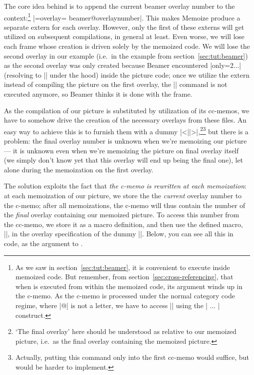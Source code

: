 \documentclass[a4paper,11pt]{article}
\begin{document}
The core idea behind  is to append the current beamer
overlay number to the context:\cprotect\footnote{As we saw in
  section~\ref{sec:tut:beamer}, it is convenient to execute  inside memoized code.  But remember, from
  section~\ref{sec:cross-referencing}, that when  is executed
  from within the memoized code, its argument winds up in the c-memo.  As the
  c-memo is processed under the normal category code regime, where |@| is not a
  letter, we have to access |\beamer@overlaynumber| using the |\csname
  ... \endcsname| construct.}  |={overlay=\csname
  beamer@overlaynumber\endcsname}|.  This makes Memoize produce a separate
extern for each overlay.  However, only the first of these externs will get
utilized on subsequent compilations, in general at least.  Even worse, we will
lose each frame whose creation is driven solely by the memoized code.  We will
lose the second overlay in our example (i.e.\ in the  example from
section~\ref{sec:tut:beamer}) as the second overlay was only created because
Beamer encountered |only={2}{...}| (resolving to || under the
hood) inside the picture code; once we utilize the extern instead of compiling
the picture on the first overlay, the |\only| command is not executed anymore,
so Beamer thinks it is done with the frame.

As the compilation of our picture is substituted by utilization of its
cc-memos, we have to somehow drive the creation of the necessary overlays from
these files.  An easy way to achieve this is to furnish them with a dummy
|\only<||>{}|,\footnote{`The final overlay' here
  should be understood as relative to our memoized picture, i.e.\ as the final
  overlay containing the memoized picture.}\footnote{Actually, putting this
   command only into the first cc-memo would suffice, but would be
  harder to implement.}  but there is a problem: the final overlay number is
unknown when we're memoizing our picture --- it is unknown even when we're
memoizing the picture on final overlay itself (we simply don't know yet that
this overlay will end up being the final one), let alone during the memoization
on the first overlay.

The solution exploits the fact that \emph{the c-memo is rewritten at each
  memoization}: at each memoization of our picture, we store the the
\emph{current} overlay number to the c-memo; after all memoizations, the c-memo
will thus contain the number of the \emph{final} overlay containing our
memoized picture.  To access this number from the cc-memo, we store it as a
macro definition, and then use the defined macro, |\mmzBeamerOverlays|, in the
overlay specification of the dummy |\only|.  Below, you can see all this in
code, as the argument to .
\end{document}
